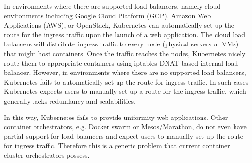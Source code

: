 In environments where there are supported load balancers, namely cloud environments including Google Cloud Platform (GCP), Amazon Web Applications (AWS), or OpenStack, Kubernetes can automatically set up the route for the ingress traffic upon the launch of a web application.
The cloud load balancers will distribute ingress traffic to every node (physical servers or VMs) that might host containers.
Once the traffic reaches the nodes, Kubernetes nicely route them to appropriate containers using iptables DNAT based internal load balancer.
%
However, in environments where there are no supported load balancers, Kubernetes fails to automatically set up the route for ingress traffic.
In such cases Kubernetes expects users to manually set up a route for the ingress traffic, which generally lacks redundancy and scalabilities.

In this way, Kubernetes fails to provide uniformity web applications.
Other container orchestrators, e.g. Docker swarm or Mesos/Marathon, do not even have partial support for load balancers and expect users to manually set up the route for ingress traffic.
Therefore this is a generic problem that current container cluster orchestrators possess.

\section{}

\subsection{}


